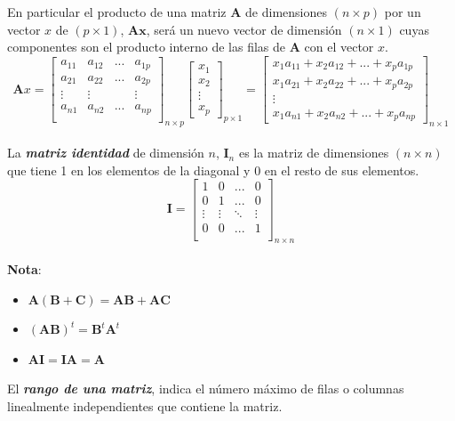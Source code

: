\documentclass[12pt,letterpaper]{report} %
\begin{document}
En particular el producto de una matriz $\mathbf{A}$ de dimensiones $(n \times p)$ por un vector $x$ de $(p \times 1)$, $\mathbf{Ax}$, será un nuevo vector de dimensión $(n \times 1)$ cuyas componentes son el producto interno de las filas de $\mathbf{A}$ con el vector $x$.
$$
\mathbf{A}x=
\begin{bmatrix}
a_{11} & a_{12} & ... & a_{1p} \\
a_{21} & a_{22} & ... & a_{2p} \\
\vdots & \vdots &     & \vdots \\
a_{n1} & a_{n2} & ... & a_{np} \\
\end{bmatrix}_{n\times p}
\begin{bmatrix} x_1 \\ x_2 \\ \vdots \\ x_p\end{bmatrix}_{p\times 1}
= \begin{bmatrix} x_1a_{11}+x_2a_{12}+...+x_pa_{1p} \\ x_1a_{21}+x_2a_{22}+...+x_pa_{2p} \\ \vdots \\ x_1a_{n1}+x_2a_{n2}+...+x_p a_{np}\end{bmatrix}_{n\times 1}
$$
\\

La \textit{\textbf{matriz identidad}} de dimensión $n$, $\mathbf{I}_n$ es la matriz de dimensiones  $(n \times n)$ que tiene 1 en los elementos de la diagonal y 0 en el resto de sus elementos.  
$$
\mathbf{I}=
\begin{bmatrix}
1 & 0 & ... & 0 \\
0 & 1 & ... & 0 \\
\vdots   & \vdots &  \ddots & \vdots \\
0 & 0 & ... & 1 \\
\end{bmatrix}_{n\times n}
$$
\\
\textbf{Nota}:
\begin{itemize}
\item $\mathbf{A}(\mathbf{B}+\mathbf{C})=\mathbf{A}\mathbf{B}+\mathbf{A}\mathbf{C}$
\item $(\mathbf{A}\mathbf{B})^t=\mathbf{B}^t\mathbf{A}^t$ 
\item $\mathbf{A}\mathbf{I}=\mathbf{I}\mathbf{A}=\mathbf{A}$
\end{itemize}

El \textit{\textbf{rango de una matriz}}, indica el número máximo de filas o columnas linealmente independientes que contiene la matriz.
\end{document}
